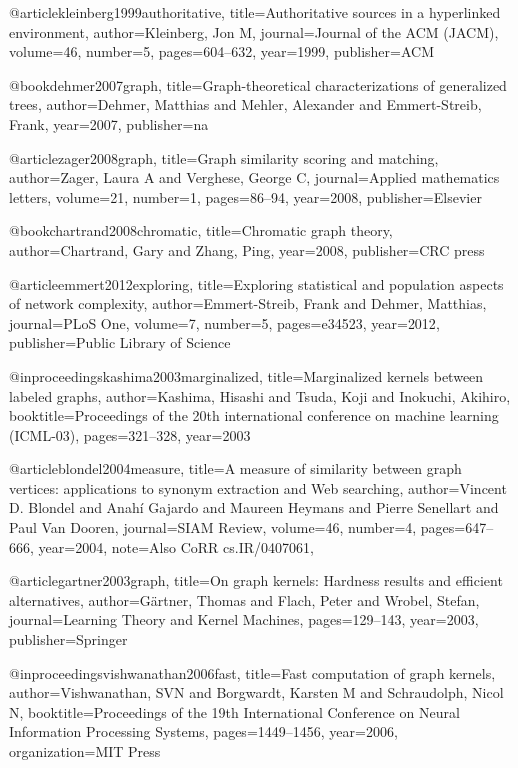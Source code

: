 @article{kleinberg1999authoritative,
  title={Authoritative sources in a hyperlinked environment},
  author={Kleinberg, Jon M},
  journal={Journal of the ACM (JACM)},
  volume={46},
  number={5},
  pages={604--632},
  year={1999},
  publisher={ACM}
}

@book{dehmer2007graph,
  title={Graph-theoretical characterizations of generalized trees},
  author={Dehmer, Matthias and Mehler, Alexander and Emmert-Streib, Frank},
  year={2007},
  publisher={na}
}

@article{zager2008graph,
  title={Graph similarity scoring and matching},
  author={Zager, Laura A and Verghese, George C},
  journal={Applied mathematics letters},
  volume={21},
  number={1},
  pages={86--94},
  year={2008},
  publisher={Elsevier}
}

@book{chartrand2008chromatic,
  title={Chromatic graph theory},
  author={Chartrand, Gary and Zhang, Ping},
  year={2008},
  publisher={CRC press}
}

@article{emmert2012exploring,
  title={Exploring statistical and population aspects of network complexity},
  author={Emmert-Streib, Frank and Dehmer, Matthias},
  journal={PLoS One},
  volume={7},
  number={5},
  pages={e34523},
  year={2012},
  publisher={Public Library of Science}
}

@inproceedings{kashima2003marginalized,
  title={Marginalized kernels between labeled graphs},
  author={Kashima, Hisashi and Tsuda, Koji and Inokuchi, Akihiro},
  booktitle={Proceedings of the 20th international conference on machine learning (ICML-03)},
  pages={321--328},
  year={2003}
}

@article{blondel2004measure,
  title={A measure of similarity between graph vertices\string: applications
        to synonym extraction and {W}eb searching},
  author={Vincent D. Blondel and Anah\'i Gajardo and Maureen Heymans and Pierre Senellart and Paul Van Dooren},
  journal={SIAM Review},
  volume={46},
  number={4},
  pages={647--666},
  year={2004},
  note={Also CoRR cs.IR/0407061},
}

@article{gartner2003graph,
  title={On graph kernels: Hardness results and efficient alternatives},
  author={G{\"a}rtner, Thomas and Flach, Peter and Wrobel, Stefan},
  journal={Learning Theory and Kernel Machines},
  pages={129--143},
  year={2003},
  publisher={Springer}
}

@inproceedings{vishwanathan2006fast,
  title={Fast computation of graph kernels},
  author={Vishwanathan, SVN and Borgwardt, Karsten M and Schraudolph, Nicol N},
  booktitle={Proceedings of the 19th International Conference on Neural Information Processing Systems},
  pages={1449--1456},
  year={2006},
  organization={MIT Press}
}

